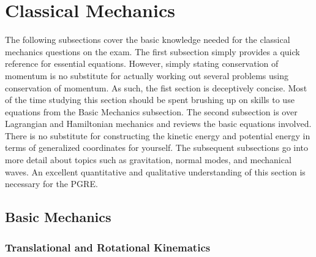 \section{Classical Mechanics}

The following subsections cover the basic knowledge needed for the classical mechanics questions on the exam.
The first subsection simply provides a quick reference for essential equations.
However, simply stating conservation of momentum is no substitute for actually working out several problems using conservation of momentum.
As such, the fist section is deceptively concise.
Most of the time studying this section should be spent brushing up on skills to use equations from the Basic Mechanics subsection.
The second subsection is over Lagrangian and Hamiltonian mechanics and reviews the basic equations involved.
There is no substitute for constructing the kinetic energy and potential energy in terms of generalized coordinates for yourself.
The subsequent subsections go into more detail about topics such as gravitation, normal modes, and mechanical waves.
An excellent quantitative and qualitative understanding of this section is necessary for the PGRE.

\subsection{Basic Mechanics}

\subsubsection{Translational and Rotational Kinematics}


